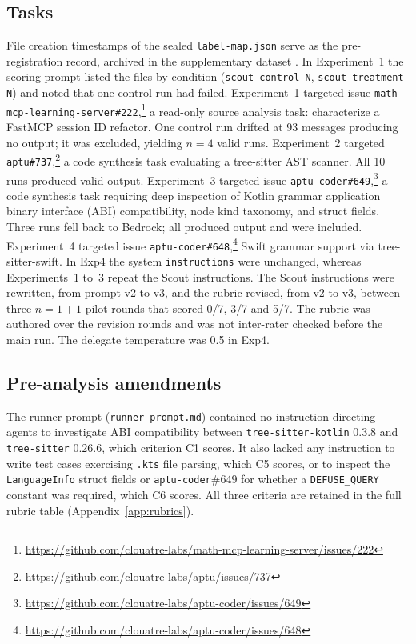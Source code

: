 \documentclass[11pt,a4paper]{article}
\begin{document}
\subsection{Tasks}

File creation timestamps of the sealed \texttt{label-map.json} serve as the pre-registration record, archived in the supplementary dataset \citep{clouatre2026dataset}.
In Experiment~1 the scoring prompt listed the files by condition (\texttt{scout-control-N}, \texttt{scout-treatment-N}) and noted that one control run had failed.
Experiment~1 targeted issue \texttt{math-mcp-learning-server\#222},\footnote{\url{https://github.com/clouatre-labs/math-mcp-learning-server/issues/222}} a read-only source analysis task: characterize a FastMCP session ID refactor.
One control run drifted at 93 messages producing no output; it was excluded, yielding $n{=}4$ valid runs.
Experiment~2 targeted \texttt{aptu\#737},\footnote{\url{https://github.com/clouatre-labs/aptu/issues/737}} a code synthesis task evaluating a tree-sitter AST scanner.
All 10 runs produced valid output.
Experiment~3 targeted issue \texttt{aptu-coder\#649},\footnote{\url{https://github.com/clouatre-labs/aptu-coder/issues/649}} a code synthesis task requiring deep inspection of Kotlin grammar application binary interface (ABI) compatibility, node kind taxonomy, and struct fields.
Three runs fell back to Bedrock; all produced output and were included.
Experiment~4 targeted issue \texttt{aptu-coder\#648},\footnote{\url{https://github.com/clouatre-labs/aptu-coder/issues/648}} Swift grammar support via tree-sitter-swift.
In Exp4 the system \texttt{instructions} were unchanged, whereas Experiments~1 to~3 repeat the Scout instructions.
The Scout instructions were rewritten, from prompt v2 to v3, and the rubric revised, from v2 to v3, between three $n{=}1{+}1$ pilot rounds that scored 0/7, 3/7 and 5/7.
The rubric was authored over the revision rounds and was not inter-rater checked before the main run.
The delegate temperature was 0.5 in Exp4.

\subsection{Pre-analysis amendments}
\label{sec:amendments}

The runner prompt (\texttt{runner-prompt.md}) contained no instruction directing agents to investigate ABI compatibility between \texttt{tree-sitter-kotlin} 0.3.8 and \texttt{tree-sitter} 0.26.6, which criterion C1 scores.
It also lacked any instruction to write test cases exercising \texttt{.kts} file parsing, which C5 scores, or to inspect the \texttt{LanguageInfo} struct fields or \texttt{aptu-coder}\#649 for whether a \texttt{DEFUSE\_QUERY} constant was required, which C6 scores.
All three criteria are retained in the full rubric table (Appendix~\ref{app:rubrics}).
\end{document}
